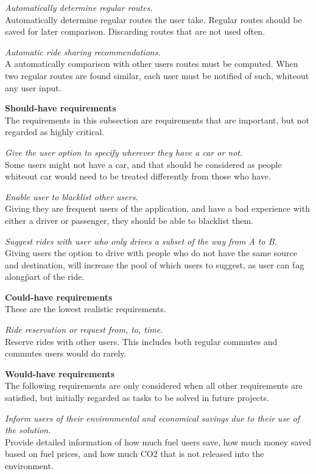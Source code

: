 \textit{Automatically determine regular routes.}\\
Automatically determine regular routes the user take. 
Regular routes should be saved for later comparison. 
Discarding routes that are not used often.

\textit{Automatic ride sharing recommendations.}\\
A automatically comparison with other users routes must be computed. When two regular routes are found similar, each user must be notified of such, whiteout any user input.


\textbf{Should-have requirements}\\
The requirements in this subsection are requirements that are important, but not regarded as highly critical.

\textit{Give the user option to specify wherever they have a car or not.}\\
Some users might not have a car, and that should be considered as people whiteout car would need to be treated differently from those who have.

\textit{Enable user to blacklist other users.}\\
Giving they are frequent users of the application, and have a bad experience with either a driver or passenger, they should be able to blacklist them.

\textit{Suggest rides with user who only drives a subset of the way from A to B.}\\
Giving users the option to drive with people who do not have the same source and destination, will increase the pool of which users to suggest, as user can \"tag along\" part of the ride.


\textbf{Could-have requirements}\\
These are the lowest realistic requirements. 

\textit{Ride reservation or request from, to, time.}\\
Reserve rides with other users. 
This includes both regular commutes and commutes users would do rarely.

\textbf{Would-have requirements}\\
The following requirements are only considered when all other requirements are satisfied, but initially regarded as tasks to be solved in future projects.

\textit{Inform users of their environmental and economical savings due to their use of the solution.}\\
Provide detailed information of how much fuel users save, how much money saved based on fuel prices, and how much CO2 that is not released into the environment. 

